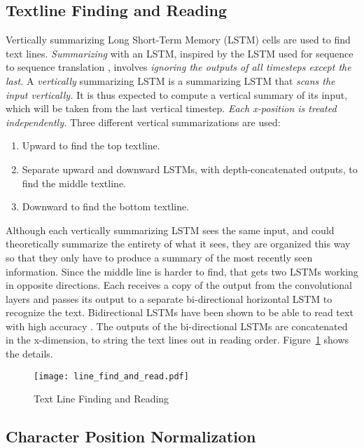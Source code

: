 \documentclass[runningheads]{llncs}
\begin{document}
\subsection{Textline Finding and Reading}
Vertically summarizing Long Short-Term Memory (LSTM)\cite{hochreiter1997long} cells
 are used to find text lines. \textit{Summarizing} with an LSTM, inspired by the LSTM used for sequence to sequence
translation \cite{NIPS2014_5346}, involves \textit{ignoring the outputs of all timesteps except the last.}
A \textit{vertically} summarizing LSTM is a summarizing LSTM that \textit{scans
 the input vertically.} It is thus expected to
 compute a vertical summary of its input, which will be taken from the last vertical timestep.
 \textit{Each x-position is treated independently.}
 Three different vertical summarizations are used:
\begin{enumerate}
\item Upward to find the top textline.
\item Separate upward and downward LSTMs, with depth-concatenated outputs, to find the middle textline.
\item Downward to find the bottom textline.
\end{enumerate}
Although each vertically summarizing LSTM sees the same input, and could theoretically
 summarize the entirety of what it sees, they are organized this way so that they only have to produce
 a summary of the most recently seen information. Since the middle line is harder to find, that gets
 two LSTMs working in opposite directions. Each receives a copy of the output from the convolutional
 layers and passes its output to a separate bi-directional horizontal LSTM to recognize the text.
 Bidirectional LSTMs have been shown to be able to read text with high
 accuracy \cite{breuel2013high}.
 The outputs of the bi-directional LSTMs are concatenated in the x-dimension, to string the text
 lines out in reading order. Figure~\ref{fig:line_find_and_read} shows the details.

\begin{figure}
\centering
\vspace{-1cm}
\texttt{[image: line\_find\_and\_read.pdf]}
\caption{Text Line Finding and Reading}
\label{fig:line_find_and_read}
\end{figure}

\subsection{Character Position Normalization}
\end{document}
